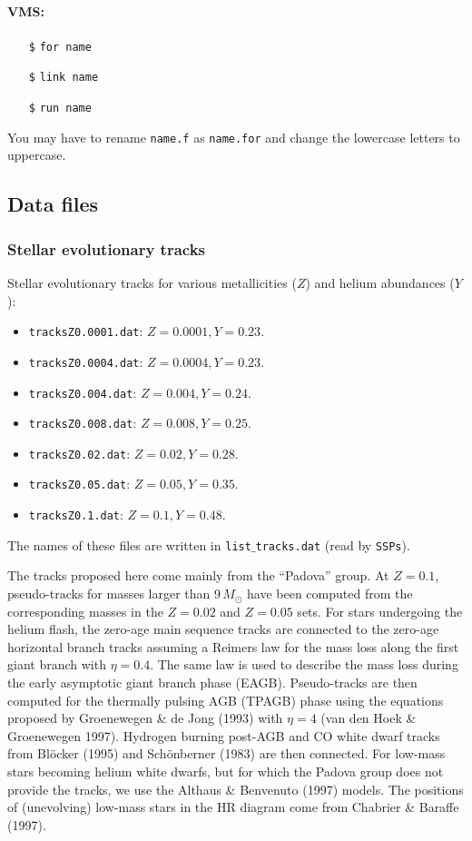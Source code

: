 \documentclass[11pt,draft,fleqn]{article}
\begin{document}
\paragraph{VMS:}
\begin{itemize}
\item[\texttt{\$}]%
\texttt{for name}
\item[\texttt{\$}]%
\texttt{link name}
\item[\texttt{\$}]%
\texttt{run name}
\end{itemize}
You may have to rename \texttt{name.f} as \texttt{name.for} and change the lowercase
letters to uppercase.
\subsection{Data files}
\subsubsection{Stellar evolutionary tracks}
Stellar evolutionary tracks for various 
metallicities ($Z$) and helium abundances ($Y$):
\begin{itemize}
\item \texttt{tracksZ0.0001.dat}: $Z=0.0001, Y=0.23$.
\item \texttt{tracksZ0.0004.dat}: $Z=0.0004, Y=0.23$.
\item \texttt{tracksZ0.004.dat}: $Z=0.004,Y=0.24$.
\item \texttt{tracksZ0.008.dat}: $Z=0.008,Y=0.25$.
\item \texttt{tracksZ0.02.dat}: $Z=0.02, Y=0.28$.
\item \texttt{tracksZ0.05.dat}: $Z=0.05, Y=0.35$.
\item \texttt{tracksZ0.1.dat}: $Z=0.1,Y=0.48$.
\end{itemize}
The names of these files are written in \texttt{list$\_$tracks.dat}
(read by \texttt{SSPs}).

The tracks proposed here come mainly from the ``Padova'' group. At $Z=0.1$, 
pseudo-tracks for masses larger than 9\,$M_{\odot}$ have been computed 
from the corresponding masses in the $Z=0.02$ and $Z=0.05$ sets. For stars
undergoing the helium flash, the zero-age main sequence tracks are 
connected to the zero-age horizontal branch tracks assuming a Reimers
law for the mass loss along the first giant branch with $\eta=0.4$. The same
law is used to describe the mass loss during the early asymptotic giant
branch phase (EAGB). Pseudo-tracks are then computed for the thermally
pulsing AGB (TPAGB) phase using the equations proposed by Groenewegen
\& de Jong (1993) with $\eta=4$ (van den Hoek \& Groenewegen 1997). Hydrogen
burning post-AGB and CO white dwarf tracks from Bl\"ocker (1995) and 
Sch\"onberner (1983) are then connected. For low-mass stars becoming
helium white dwarfs, but for which the Padova group does not provide
the tracks, we use the Althaus \& Benvenuto (1997) models. The positions
of (unevolving) low-mass stars in the HR diagram come from Chabrier \& 
Baraffe (1997).
\end{document}
